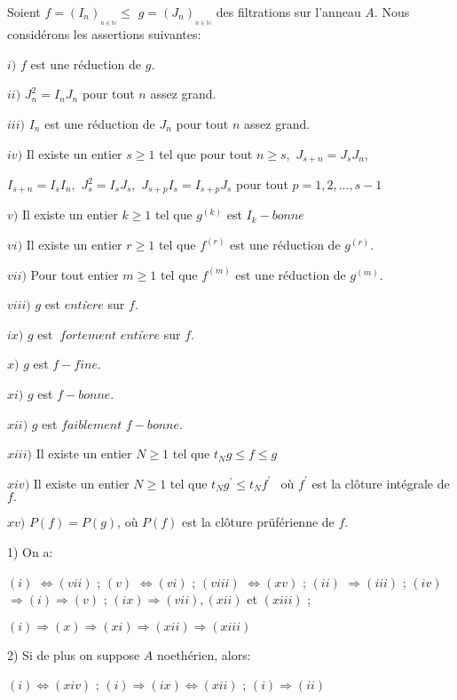 \begin{montheoreme}
	Soient $f=(I_{n})_{_{n\in \mathbb{N}}}\leq $ $g=(J_{n})_{_{n\in \mathbb{N}}}$ des filtrations sur l'anneau $A.$ Nous
	considérons les assertions suivantes:
	
	$i)$ $f$ est une réduction de $g.$
	
	$ii)$ $J_{n}^{2}=I_{n}J_{n}$ pour tout $n$ assez grand.
	
	$iii)$ $I_{n}$ est une réduction de $J_{n}$ pour tout $n$ assez grand.
	
	$iv)$ Il existe un entier $s\geq 1$ tel que pour tout $n\geq s,$ $J_{s+n}=J_{s}J_{n},$
	
	$I_{s+n}=I_{s}I_{n},$ $J_{s}^{2}=I_{s}J_{s},$ $J_{s+p}I_{s}=I_{s+p}J_{s}$ pour tout $p=1,2,...,s-1$
	
	$v)$ Il existe un entier $k\geq 1$ tel que $g^{(k)}$ est $I_{k}-bonne$
	
	$vi)$ Il existe un entier $r\geq 1$ tel que $f^{(r)}$ est une réduction de $g^{(r)}.$
	
	$vii)$ Pour tout entier $m\geq 1$ tel que $f^{(m)}$ est une réduction de $g^{(m)}.$
	
	$viii)$ $g$ est $enti\grave{e}re$ sur $f.$
	
	$ix)$ $g$ est $\ fortement$ $enti\grave{e}re$ sur $f.$
	
	$x)$ $g$ est $f-fine.$
	
	$xi)$ $g$ est $f-bonne.$
	
	$xii)$ $g$ est $faiblement$ $f-bonne.$
	
	$xiii)$ Il existe un entier $N\geq 1$ tel que $t_{N}g\leq f\leq g$
	
	$xiv)$ Il existe un entier $N\geq 1$ tel que $t_{N}g^{\prime }\leq
	t_{N}f^{\prime \text{ }}$ o\`{u} $f^{\prime }$ est la clôture intégrale de $f.$
	
	$xv)$ $P(f)=P(g)$, o\`{u} $P(f)$ est la clôture prüférienne de $f.$
	
	1) On a:
	
	$(i)$ $\Longleftrightarrow (vii)$ ; $(v)$ $\Longleftrightarrow (vi)$ ; $(viii)$ $\Longleftrightarrow (xv)$ ; $(ii)$ $\Longrightarrow (iii)$ ; $(iv)$ 
	$\Longrightarrow (i)\Longrightarrow (v)$ ; $(ix)\Longrightarrow (vii),(xii)$
	et $(xiii)$ ;
	
	$(i)\Longrightarrow (x)\Longrightarrow (xi)\Longrightarrow
	(xii)\Longrightarrow (xiii)$
	
	2) Si de plus on suppose $A$ noethérien, alors:
	
	$(i)\Longleftrightarrow (xiv)$ ; $(i)\Longrightarrow (ix)\Longleftrightarrow
	(xii)$ ; $(i)\Longrightarrow (ii)$
	

\end{montheoreme}
